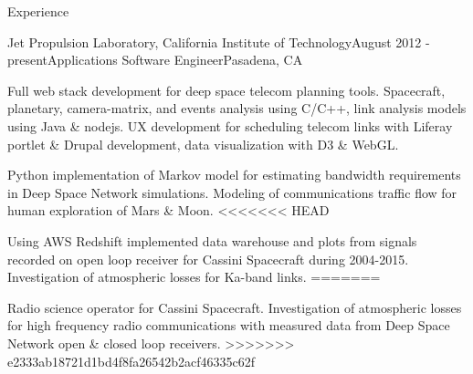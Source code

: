 \documentclass{resume} %
\begin{document}





\begin{rSection}{Experience}

\begin{rSubsection}{Jet Propulsion Laboratory, California Institute of Technology}{August 2012 - present}{Applications Software Engineer}{Pasadena, CA}
\item Full web stack development for deep space telecom planning tools. Spacecraft, planetary, camera-matrix, and events analysis using C/C++, link analysis models using Java \& nodejs. UX development for scheduling telecom links with Liferay portlet \& Drupal development, data visualization with D3 \& WebGL. 
\item  Python implementation of Markov model for estimating bandwidth requirements in Deep Space Network simulations. Modeling of communications traffic flow for human exploration of Mars \& Moon. 
<<<<<<< HEAD
\item Using AWS Redshift implemented data warehouse and plots from signals recorded on open loop receiver for Cassini Spacecraft during 2004-2015. Investigation of atmospheric losses for Ka-band links. 
=======
\item Radio science operator for Cassini Spacecraft. Investigation of atmospheric losses for high frequency radio communications with measured data from Deep Space Network open \& closed loop receivers. 
>>>>>>> e2333ab18721d1bd4f8fa26542b2acf46335c62f


\end{rSubsection}



\end{rSection}
\end{document}
